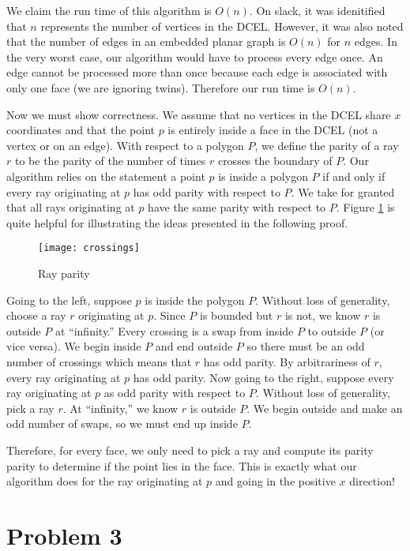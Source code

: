\documentclass[11pt]{article}
\begin{document}
We claim the run time of this algorithm is $O(n)$.
On slack, it was idenitified that $n$ represents the number of vertices in the DCEL.
However, it was also noted that the number of edges in an embedded planar graph is $O(n)$ for $n$ edges.
In the very worst case, our algorithm would have to process every edge once.
An edge cannot be processed more than once because each edge is associated with only one face (we are ignoring twins).
Therefore our run time is $O(n)$.

Now we must show correctness.
We assume that no vertices in the DCEL share $x$ coordinates and that the point $p$ is entirely inside a face in the DCEL (not a vertex or on an edge).
With respect to a polygon $P$, we define the parity of a ray $r$ to be the parity of the number of times $r$ crosses the boundary of $P$.
Our algorithm relies on the statement a point $p$ is inside a polygon $P$ if and only if every ray originating at $p$ has odd parity with respect to $P$.
We take for granted that all rays originating at $p$ have the same parity with respect to $P$.
Figure \ref{fig:crossings} is quite helpful for illustrating the ideas presented in the following proof.

\begin{figure}[h]
   \centering
   \texttt{[image: crossings]}
   \caption{Ray parity}
   \label{fig:crossings}
\end{figure}

Going to the left, suppose $p$ is inside the polygon $P$.
Without loss of generality, choose a ray $r$ originating at $p$.
Since $P$ is bounded but $r$ is not, we know $r$ is outside $P$ at ``infinity.''
Every crossing is a swap from inside $P$ to outside $P$ (or vice versa).
We begin inside $P$ and end outside $P$ so there must be an odd number of crossings which means that $r$ has odd parity.
By arbitrariness of $r$, every ray originating at $p$ has odd parity.
Now going to the right, suppose every ray originating at $p$ as odd parity with respect to $P$.
Without loss of generality, pick a ray $r$.
At ``infinity,'' we know $r$ is outside $P$.
We begin outside and make an odd number of swaps, so we must end up inside $P$.

Therefore, for every face, we only need to pick a ray and compute its parity parity to determine if the point lies in the face.
This is exactly what our algorithm does for the ray originating at $p$ and going in the positive $x$ direction!

\newpage
\section*{Problem 3}
\end{document}

